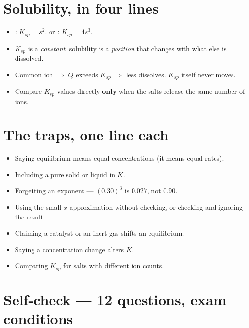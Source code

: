 \documentclass{apchem-worksheet}
\begin{document}
\section*{\sffamily Solubility, in four lines}

\begin{itemize}[leftmargin=*,itemsep=0.18em]
  \item {}: $K_{sp} = s^2$.  or :
        $K_{sp} = 4s^3$.
  \item $K_{sp}$ is a \emph{constant}; solubility is a \emph{position}
        that changes with what else is dissolved.
  \item Common ion $\Rightarrow$ $Q$ exceeds $K_{sp}$ $\Rightarrow$ less
        dissolves. $K_{sp}$ itself never moves.
  \item Compare $K_{sp}$ values directly \textbf{only} when the salts
        release the same number of ions.
\end{itemize}

\section*{\sffamily The traps, one line each}

\begin{itemize}[leftmargin=*,itemsep=0.22em]
  \item Saying equilibrium means equal concentrations (it means equal
        rates).
  \item Including a pure solid or liquid in $K$.
  \item Forgetting an exponent --- $(0.30)^3$ is $0.027$, not $0.90$.
  \item Using the small-$x$ approximation without checking, or checking and
        ignoring the result.
  \item Claiming a catalyst or an inert gas shifts an equilibrium.
  \item Saying a concentration change alters $K$.
  \item Comparing $K_{sp}$ for salts with different ion counts.
\end{itemize}

\section*{\sffamily Self-check --- 12 questions, exam conditions}
\end{document}
